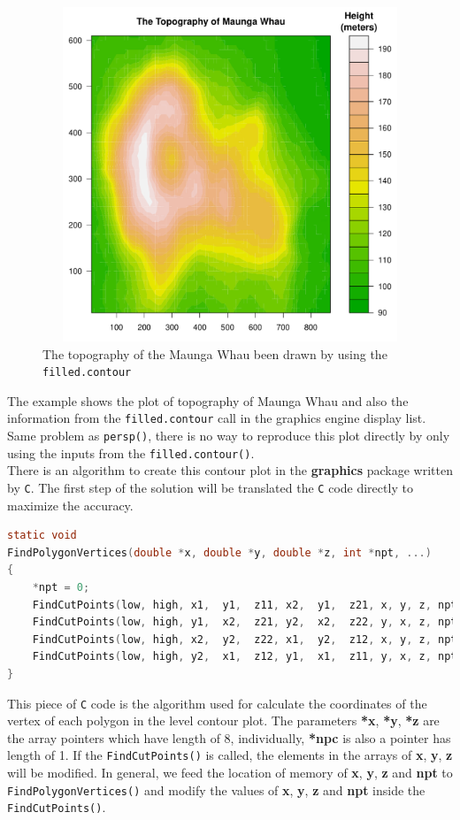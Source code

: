 \documentclass{report}
\begin{document}
\begin{figure}[h]
	\begin{center}
		\includegraphics[height = 10cm, width = 12cm]{figure/filled_example_1.pdf}
		\caption{The topography of the Maunga Whau been drawn by using the \texttt{filled.contour}}
		\label{figure_3.6}
	\end{center}
\end{figure}

\newpage
The example shows the plot of topography of Maunga Whau and also the information from the \texttt{filled.contour} call in the graphics engine display list. Same problem as \texttt{persp()}, there is no way to reproduce this plot directly by only using the inputs from the \texttt{filled.contour()}.\\

There is an algorithm to create this contour plot in the \textbf{graphics} package written by \texttt{C}. The first step of the solution will be translated the \texttt{C} code directly to maximize the accuracy.\\

\begin{lstlisting}[language = C]
static void
FindPolygonVertices(double *x, double *y, double *z, int *npt, ...)
{
    *npt = 0;
    FindCutPoints(low, high, x1,  y1,  z11, x2,  y1,  z21, x, y, z, npt);
    FindCutPoints(low, high, y1,  x2,  z21, y2,  x2,  z22, y, x, z, npt);
    FindCutPoints(low, high, x2,  y2,  z22, x1,  y2,  z12, x, y, z, npt);
    FindCutPoints(low, high, y2,  x1,  z12, y1,  x1,  z11, y, x, z, npt);
}
\end{lstlisting}
This piece of \texttt{C} code is the algorithm used for calculate the coordinates of the vertex of each polygon in the level contour plot. The parameters \textbf{*x}, \textbf{*y}, \textbf{*z} are the array pointers which have length of 8, individually, \textbf{*npc} is also a pointer has length of 1. If the \texttt{FindCutPoints()} is called, the elements in the arrays of \textbf{x}, \textbf{y}, \textbf{z} will be modified. In general, we feed the location of memory of \textbf{x}, \textbf{y}, \textbf{z} and \textbf{npt} to \texttt{FindPolygonVertices()} and modify the values of \textbf{x}, \textbf{y}, \textbf{z} and \textbf{npt} inside the \texttt{FindCutPoints()}.\\
\end{document}
